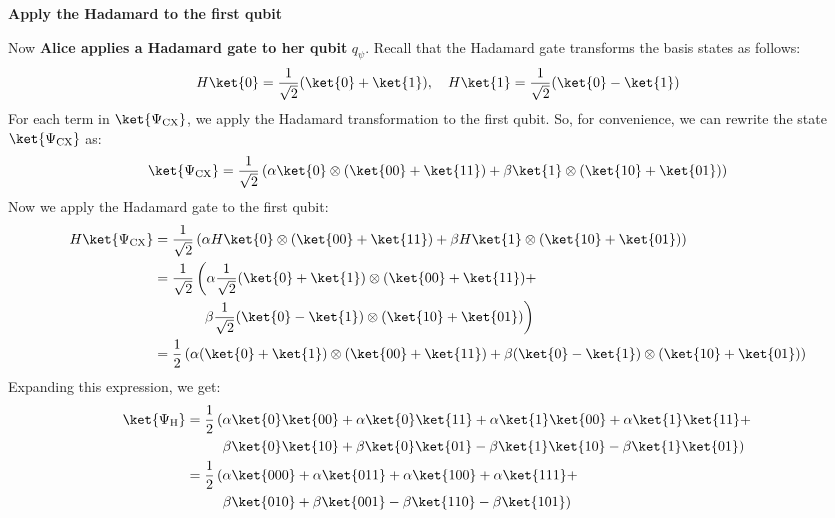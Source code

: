 \highspace
\begin{flushleft}
    \textcolor{Green3}{ \textbf{Apply the Hadamard to the first qubit}}
\end{flushleft}
Now \textbf{Alice applies a Hadamard gate to her qubit} $q_{\psi}$. Recall that the Hadamard gate transforms the basis states as follows:
\begin{equation*}
    H \ket{0} = \frac{1}{\sqrt{2}} (\ket{0} + \ket{1}), \quad
    H \ket{1} = \frac{1}{\sqrt{2}} (\ket{0} - \ket{1})
\end{equation*}
For each term in $\ket{\Psi_{\text{CX}}}$, we apply the Hadamard transformation to the first qubit. So, for convenience, we can rewrite the state $\ket{\Psi_{\text{CX}}}$ as:
\begin{equation*}
    \ket{\Psi_{\text{CX}}} = \frac{1}{\sqrt{2}} \left(
        \alpha \ket{0} \otimes (\ket{00} + \ket{11}) +
        \beta \ket{1} \otimes (\ket{10} + \ket{01})
    \right)
\end{equation*}
Now we apply the Hadamard gate to the first qubit:
\begin{align*}
    H \ket{\Psi_{\text{CX}}} &= \frac{1}{\sqrt{2}} \left(
        \alpha H\ket{0} \otimes (\ket{00} + \ket{11}) +
        \beta H\ket{1} \otimes (\ket{10} + \ket{01})
    \right) \\
    &= \frac{1}{\sqrt{2}} \left(
        \alpha \frac{1}{\sqrt{2}} (\ket{0} + \ket{1}) \otimes (\ket{00} + \ket{11}) + \right. \\
        & \hspace{1.2cm} \left. \beta \frac{1}{\sqrt{2}} (\ket{0} - \ket{1}) \otimes (\ket{10} + \ket{01})
    \right) \\
    &= \frac{1}{2} \left(
        \alpha (\ket{0} + \ket{1}) \otimes (\ket{00} + \ket{11}) +
        \beta (\ket{0} - \ket{1}) \otimes (\ket{10} + \ket{01})
    \right)
\end{align*}
Expanding this expression, we get:
\begin{align*}
    \ket{\Psi_{\text{H}}} &= \frac{1}{2} \left(
        \alpha \ket{0} \ket{00} + \alpha \ket{0} \ket{11} + \alpha \ket{1} \ket{00} + \alpha \ket{1} \ket{11} + \right. \\
        & \hspace{0.83cm} \left. \beta \ket{0} \ket{10} + \beta \ket{0} \ket{01} - \beta \ket{1} \ket{10} - \beta \ket{1} \ket{01}
    \right) \\
    &= \frac{1}{2} \left(
        \alpha \ket{000} + \alpha \ket{011} + \alpha \ket{100} + \alpha \ket{111} + \right. \\
        & \hspace{0.83cm} \left. \beta \ket{010} + \beta \ket{001} - \beta \ket{110} - \beta \ket{101}
    \right)
\end{align*}
